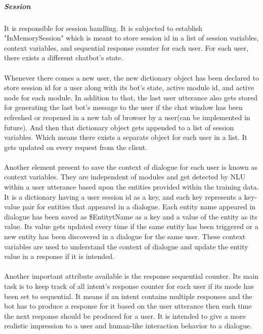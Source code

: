 \subparagraph*{Session}
It is responsible for session handling. It is subjected to establish "InMemorySession" which is meant to store session id in a list of session variables, context variables, and sequential response counter for each user. For each user, there exists a different chatbot's state. 
\\~\\
Whenever there comes a new user, the new dictionary object has been declared to store session id for a user along with its bot's state, active module id, and active node for each module. In addition to that, the last user utterance also gets stored for generating the last bot's message to the user if the chat window has been refreshed or reopened in a new tab of browser by a user(can be implemented in future). And then that dictionary object gets appended to a list of session variables. Which means there exists a separate object for each user in a list. It gets updated on every request from the client.
\\~\\
Another element present to save the context of dialogue for each user is known as context variables. They are independent of modules and get detected by NLU within a user utterance based upon the entities provided within the training data.  It is a dictionary having a user session id as a key, and each key represents a key-value pair for entities that appeared in a dialogue. Each entity name appeared in dialogue has been saved as \$EntitytName as a key and a value of the entity as its value. Its value gets updated every time if the same entity has been triggered or a new entity has been discovered in a dialogue for the same user. These context variables are used to understand the context of dialogue and update the entity value in a response if it is intended.
\\~\\
Another important attribute available is the response sequential counter. Its main task is to keep track of all intent's response counter for each user if its mode has been set to sequential. It means if an intent contains multiple responses and the bot has to produce a response for it based on the user utterance then each time the next response should be produced for a user. It is intended to give a more realistic impression to a user and human-like interaction behavior to a dialogue.


